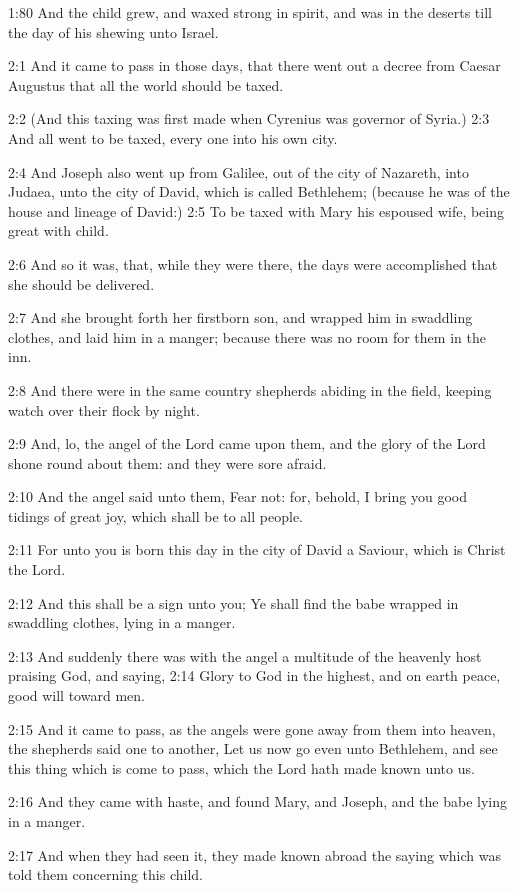 1:80 And the child grew, and waxed strong in spirit, and was in the
deserts till the day of his shewing unto Israel.

2:1 And it came to pass in those days, that there went out a decree
from Caesar Augustus that all the world should be taxed.

2:2 (And this taxing was first made when Cyrenius was governor of
Syria.)  2:3 And all went to be taxed, every one into his own city.

2:4 And Joseph also went up from Galilee, out of the city of Nazareth,
into Judaea, unto the city of David, which is called Bethlehem;
(because he was of the house and lineage of David:) 2:5 To be taxed
with Mary his espoused wife, being great with child.

2:6 And so it was, that, while they were there, the days were
accomplished that she should be delivered.

2:7 And she brought forth her firstborn son, and wrapped him in
swaddling clothes, and laid him in a manger; because there was no room
for them in the inn.

2:8 And there were in the same country shepherds abiding in the field,
keeping watch over their flock by night.

2:9 And, lo, the angel of the Lord came upon them, and the glory of
the Lord shone round about them: and they were sore afraid.

2:10 And the angel said unto them, Fear not: for, behold, I bring you
good tidings of great joy, which shall be to all people.

2:11 For unto you is born this day in the city of David a Saviour,
which is Christ the Lord.

2:12 And this shall be a sign unto you; Ye shall find the babe wrapped
in swaddling clothes, lying in a manger.

2:13 And suddenly there was with the angel a multitude of the heavenly
host praising God, and saying, 2:14 Glory to God in the highest, and
on earth peace, good will toward men.

2:15 And it came to pass, as the angels were gone away from them into
heaven, the shepherds said one to another, Let us now go even unto
Bethlehem, and see this thing which is come to pass, which the Lord
hath made known unto us.

2:16 And they came with haste, and found Mary, and Joseph, and the
babe lying in a manger.

2:17 And when they had seen it, they made known abroad the saying
which was told them concerning this child.

